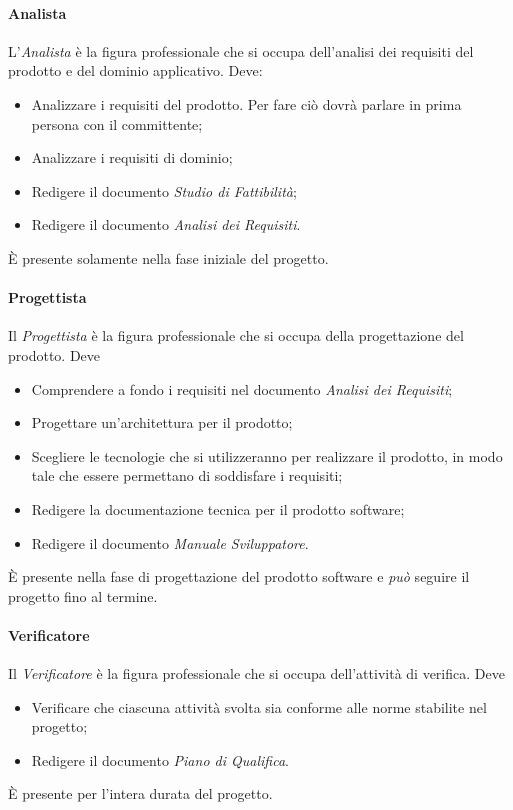 		\paragraph{Analista} \Spazio
		L'\emph{Analista} è la figura professionale che si occupa dell'analisi dei requisiti del prodotto e del dominio applicativo. Deve:
		\begin{itemize}
			\item Analizzare i requisiti del prodotto. Per fare ciò dovrà parlare in prima persona con il committente;
			\item Analizzare i requisiti di dominio;
			\item Redigere il documento \emph{Studio di Fattibilità};
			\item Redigere il documento \emph{Analisi dei Requisiti}.
		\end{itemize}
		È presente solamente nella fase iniziale del progetto.
		\paragraph{Progettista} \Spazio
		Il \emph{Progettista} è la figura professionale che si occupa della progettazione del prodotto. Deve
		\begin{itemize}
			\item Comprendere a fondo i requisiti nel documento \emph{Analisi dei Requisiti};
			\item Progettare un'architettura per il prodotto;
			\item Scegliere le tecnologie che si utilizzeranno per realizzare il prodotto, in modo tale che essere permettano di soddisfare i requisiti;
			\item Redigere la documentazione tecnica per il prodotto software;
			\item Redigere il documento \emph{Manuale Sviluppatore}.
		\end{itemize}
		È presente nella fase di progettazione del prodotto software e \emph{può} seguire il progetto fino al termine.
		\paragraph{Verificatore} \Spazio
		Il \emph{Verificatore} è la figura professionale che si occupa dell'attività di verifica. Deve
		\begin{itemize}
			\item Verificare che ciascuna attività svolta sia conforme alle norme stabilite nel progetto;
			\item Redigere il documento \emph{Piano di Qualifica}.
		\end{itemize}
		È presente per l'intera durata del progetto.
